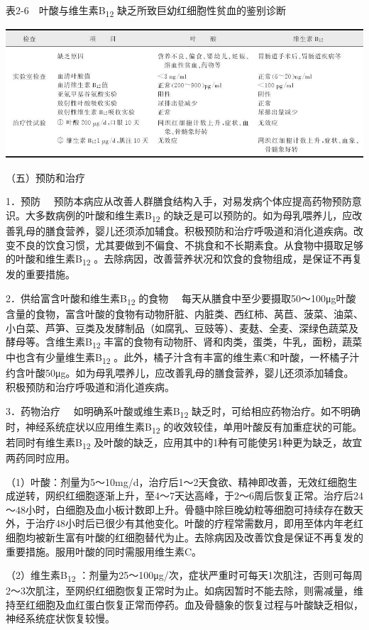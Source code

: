 表2-6　叶酸与维生素B\textsubscript{12}
缺乏所致巨幼红细胞性贫血的鉴别诊断

\includegraphics{./images/Image00015.jpg}

（五）预防和治疗

{1．预防}
　预防本病应从改善人群膳食结构入手，对易发病个体应提高药物预防意识。大多数病例的叶酸和维生素B\textsubscript{12}
的缺乏是可以预防的。如为母乳喂养儿，应改善乳母的膳食营养，婴儿还须添加辅食。积极预防和治疗呼吸道和消化道疾病。改变不良的饮食习惯，尤其要做到不偏食、不挑食和不长期素食。从食物中摄取足够的叶酸和维生素B\textsubscript{12}
。去除病因，改善营养状况和饮食的食物组成，是保证不再复发的重要措施。

{2．供给富含叶酸和维生素B\textsubscript{12} 的食物}
　每天从膳食中至少要摄取50～100μg叶酸含量的食物，富含叶酸的食物有动物肝脏、内脏类、西红柿、莴苣、菠菜、油菜、小白菜、芦笋、豆类及发酵制品（如腐乳、豆豉等）、麦麸、全麦、深绿色蔬菜及酵母等。含维生素B\textsubscript{12}
丰富的食物有动物肝、肾和肉类，蛋类，牛乳，面粉，蔬菜中也含有少量维生素B\textsubscript{12}
。此外，橘子汁含有丰富的维生素C和叶酸，一杯橘子汁约含叶酸50μg。如为母乳喂养儿，应改善乳母的膳食营养，婴儿还须添加辅食。积极预防和治疗呼吸道和消化道疾病。

{3．药物治疗} 　如明确系叶酸或维生素B\textsubscript{12}
缺乏时，可给相应药物治疗。如不明确时，神经系统症状以应用维生素B\textsubscript{12}
的收效较佳，单用叶酸反有加重症状的可能。若同时有维生素B\textsubscript{12}
及叶酸的缺乏，应用其中的1种有可能使另1种更为缺乏，故宜两药同时应用。

（1）叶酸：剂量为5～10mg/d，治疗后1～2天食欲、精神即改善，无效红细胞生成逆转，网织红细胞逐渐上升，至4～7天达高峰，于2～6周后恢复正常。治疗后24～48小时，白细胞及血小板计数即上升。骨髓中除巨晚幼粒等细胞可持续存在数天外，于治疗48小时后已很少有其他变化。叶酸的疗程常需数月，即用至体内年老红细胞均被新生富有叶酸的红细胞替代为止。去除病因及改善饮食是保证不再复发的重要措施。服用叶酸的同时需服用维生素C。

（2）维生素B\textsubscript{12}
：剂量为25～100μg/次，症状严重时可每天1次肌注，否则可每周2～3次肌注，至网织红细胞恢复正常时为止。如病因暂时不能去除，则需减量，维持至红细胞及血红蛋白恢复正常而停药。血及骨髓象的恢复过程与叶酸缺乏相似，神经系统症状恢复较慢。

